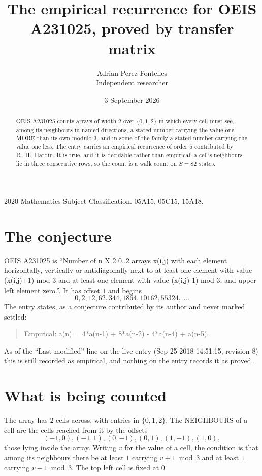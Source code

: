 \documentclass[11pt,a4paper]{article}
\title{The empirical recurrence for OEIS A231025, proved by transfer matrix}
\author{Adrian Perez Fontelles\\ \small Independent researcher}
\date{3 September 2026}
\theoremstyle{plain}
\theoremstyle{definition}
\begin{document}
\maketitle

\begin{abstract}
OEIS A231025 counts arrays of width $2$ over $\{0,1,2\}$ in which every cell must see, among its
neighbours in named directions, a stated number carrying the value one MORE than its own
modulo $3$, and in some of the family a stated number carrying the value one less. The entry
carries an empirical recurrence of order $5$ contributed by R.~H.~Hardin. It is true, and
it is decidable rather than empirical: a cell's neighbours lie in three consecutive rows, so
the count is a walk count on $S=82$ states.
\end{abstract}

\noindent\small 2020 Mathematics Subject Classification. 05A15, 05C15, 15A18.\normalsize

\section{The conjecture}

OEIS A231025 is ``Number of n X 2 0..2 arrays x(i,j) with each element horizontally, vertically or antidiagonally next to at least one element with value (x(i,j)+1) mod 3 and at least one element with value (x(i,j)-1) mod 3, and upper left element zero.''. It has offset $1$ and begins
\[
0, 2, 12, 62, 344, 1864, 10162, 55324,\ \dots
\]
The entry states, as a conjecture contributed by its author and never marked settled:
\begin{quote}
Empirical: a(n) = 4*a(n-1) + 8*a(n-2) - 4*a(n-4) + a(n-5).
\end{quote}
As of the ``Last modified'' line on the live entry (Sep 25 2018 14:51:15, revision 8) this is still
recorded as empirical, and nothing on the entry records it as proved.

\section{What is being counted}

The array has $2$ cells across, with entries in $\{0,1,2\}$. The NEIGHBOURS of a cell are the
cells reached from it by the offsets
\[
(-1,0), (-1,1), (0,-1), (0,1), (1,-1), (1,0),
\]
those lying inside the array. Writing $v$ for the value of a cell, the condition is that among
its neighbours there be at least $1$ carrying $v+1 \bmod 3$ and at least $1$ carrying $v-1 \bmod 3$. The top left
cell is fixed at $0$.
\end{document}
